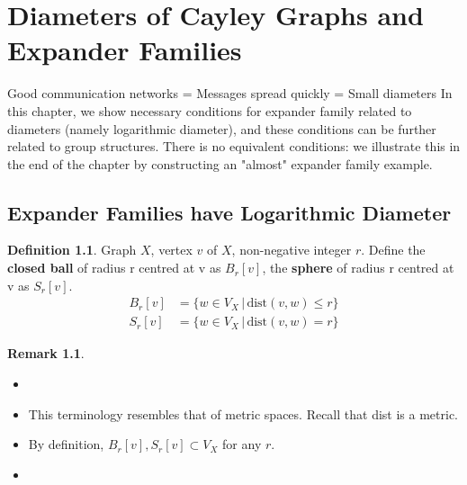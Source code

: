 \documentclass{book}
\newcommand{\define}[1]{\textbf{#1}}
\newcommand{\dist}[1]{\textrm{dist}( #1 )}
\theoremstyle{definition}
\newtheorem{definition}[lemma]{Definition}
\theoremstyle{remarkstyle}
\newtheorem*{remark}{Remark}%
\begin{document}
\setcounter{chapter}{3}
\chapter{Diameters of Cayley Graphs and Expander Families}



Good communication networks = Messages spread quickly = Small diameters \newline
In this chapter, we show necessary conditions for expander family related to diameters (namely logarithmic diameter), and these conditions can be further related to group structures. There is no equivalent conditions: we illustrate this in the end of the chapter by constructing an "almost" expander family example. 

\section{Expander Families have Logarithmic Diameter}
\begin{definition}
    Graph $X$, vertex $v$ of $X$, non-negative integer $r$. Define the \define{closed ball} of radius r centred at v as $B_{r}[v]$, the \define{sphere} of radius r centred at v as $S_{r}[v]$.
    \begin{align*}
        B_{r}[v] &= \{ w \in V_{X} \, \vert \, \dist{v,w} \le r\} \\
        S_{r}[v] &= \{ w \in V_{X} \, \vert \, \dist{v,w} = r\}
    \end{align*} 
\end{definition}
\begin{remark}
    \begin{itemize}
        \item[]
        \item This terminology resembles that of metric spaces. Recall that dist is a metric. 
        \item By definition, $B_{r}[v], S_{r}[v] \subset V_{X}$ for any $r$.
        \item[] 
    \end{itemize}
\end{remark}
\end{document}
